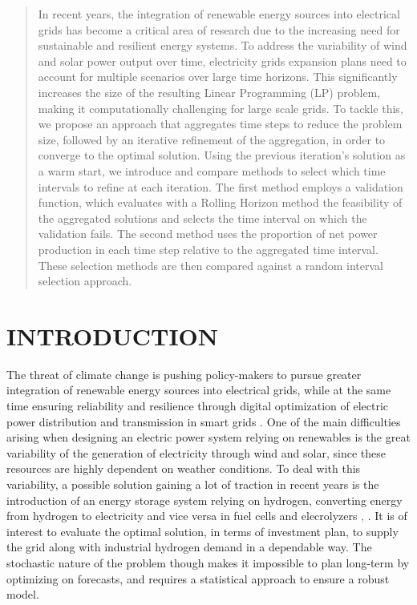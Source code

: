 \begin{abstract}
  In recent years, the integration of renewable energy sources into electrical grids has become a critical area of research due to the increasing need for sustainable and resilient energy systems. 
  To address the variability of wind and solar power output over time, electricity grids expansion plans need to account for multiple scenarios over large time horizons.
  This significantly increases the size of the resulting Linear Programming (LP) problem, making it computationally challenging for large scale grids. 
  To tackle this, we propose an approach that aggregates time steps to reduce the problem size, followed by an iterative refinement of the aggregation, in order to converge to the optimal solution.
  Using the previous iteration's solution as a warm start, we introduce and compare methods to select which time intervals to refine at each iteration.
  The first method employs a validation function, which evaluates with a Rolling Horizon method the feasibility of the aggregated solutions and selects the time interval on which the validation fails. 
  The second method uses the proportion of net power production in each time step relative to the aggregated time interval. 
  These selection methods are then compared against a random interval selection approach. 


\end{abstract}



\newpage
\section{INTRODUCTION}


The threat of climate change is pushing policy-makers to pursue greater integration of renewable energy sources into
 electrical grids, while at the same time ensuring reliability and resilience through digital optimization of electric 
 power distribution and transmission in smart grids \textcolor{green}{\cite{EU_context}}. 
One of the main difficulties arising when designing an electric power system relying on renewables is the great variability
 of the generation of electricity through wind and solar, since these resources are highly dependent on weather conditions. 
To deal with this variability, a possible solution gaining a lot of traction in recent years is the introduction of an energy
 storage system relying on hydrogen, converting energy from hydrogen to electricity and vice versa in fuel cells and 
 elecrolyzers \textcolor{green}{\cite{INTRO_blanco}, \cite{INTRO_parra}}. 
It is of interest to evaluate the optimal solution, in terms of investment plan, to supply the grid along with industrial
 hydrogen demand in a dependable way. 
The stochastic nature of the problem though makes it impossible to plan long-term by optimizing on forecasts, and requires
 a statistical approach to ensure a robust model.

